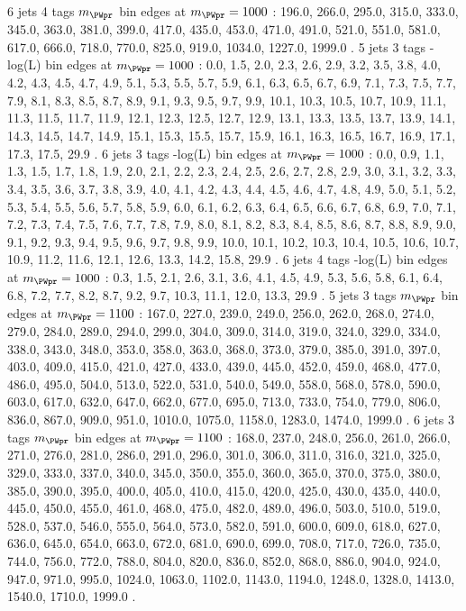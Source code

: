 6 jets 4 \Pqb tags $m_{\PWpr}$ bin edges at $m_{\PWpr}=1000$ \GeV:
196.0, 266.0, 295.0, 315.0, 333.0, 345.0, 363.0, 381.0, 399.0, 417.0, 435.0, 453.0, 471.0, 491.0, 521.0, 551.0, 581.0, 617.0, 666.0, 718.0, 770.0, 825.0, 919.0, 1034.0, 1227.0, 1999.0 .
5 jets 3 \Pqb tags -log(L) bin edges at $m_{\PWpr}=1000$ \GeV:
0.0, 1.5, 2.0, 2.3, 2.6, 2.9, 3.2, 3.5, 3.8, 4.0, 4.2, 4.3, 4.5, 4.7, 4.9, 5.1, 5.3, 5.5, 5.7, 5.9, 6.1, 6.3, 6.5, 6.7, 6.9, 7.1, 7.3, 7.5, 7.7, 7.9, 8.1, 8.3, 8.5, 8.7, 8.9, 9.1, 9.3, 9.5, 9.7, 9.9, 10.1, 10.3, 10.5, 10.7, 10.9, 11.1, 11.3, 11.5, 11.7, 11.9, 12.1, 12.3, 12.5, 12.7, 12.9, 13.1, 13.3, 13.5, 13.7, 13.9, 14.1, 14.3, 14.5, 14.7, 14.9, 15.1, 15.3, 15.5, 15.7, 15.9, 16.1, 16.3, 16.5, 16.7, 16.9, 17.1, 17.3, 17.5, 29.9 .
6 jets 3 \Pqb tags -log(L) bin edges at $m_{\PWpr}=1000$ \GeV:
0.0, 0.9, 1.1, 1.3, 1.5, 1.7, 1.8, 1.9, 2.0, 2.1, 2.2, 2.3, 2.4, 2.5, 2.6, 2.7, 2.8, 2.9, 3.0, 3.1, 3.2, 3.3, 3.4, 3.5, 3.6, 3.7, 3.8, 3.9, 4.0, 4.1, 4.2, 4.3, 4.4, 4.5, 4.6, 4.7, 4.8, 4.9, 5.0, 5.1, 5.2, 5.3, 5.4, 5.5, 5.6, 5.7, 5.8, 5.9, 6.0, 6.1, 6.2, 6.3, 6.4, 6.5, 6.6, 6.7, 6.8, 6.9, 7.0, 7.1, 7.2, 7.3, 7.4, 7.5, 7.6, 7.7, 7.8, 7.9, 8.0, 8.1, 8.2, 8.3, 8.4, 8.5, 8.6, 8.7, 8.8, 8.9, 9.0, 9.1, 9.2, 9.3, 9.4, 9.5, 9.6, 9.7, 9.8, 9.9, 10.0, 10.1, 10.2, 10.3, 10.4, 10.5, 10.6, 10.7, 10.9, 11.2, 11.6, 12.1, 12.6, 13.3, 14.2, 15.8, 29.9 .
6 jets 4 \Pqb tags -log(L) bin edges at $m_{\PWpr}=1000$ \GeV:
0.3, 1.5, 2.1, 2.6, 3.1, 3.6, 4.1, 4.5, 4.9, 5.3, 5.6, 5.8, 6.1, 6.4, 6.8, 7.2, 7.7, 8.2, 8.7, 9.2, 9.7, 10.3, 11.1, 12.0, 13.3, 29.9 .
5 jets 3 \Pqb tags $m_{\PWpr}$ bin edges at $m_{\PWpr}=1100$ \GeV:
167.0, 227.0, 239.0, 249.0, 256.0, 262.0, 268.0, 274.0, 279.0, 284.0, 289.0, 294.0, 299.0, 304.0, 309.0, 314.0, 319.0, 324.0, 329.0, 334.0, 338.0, 343.0, 348.0, 353.0, 358.0, 363.0, 368.0, 373.0, 379.0, 385.0, 391.0, 397.0, 403.0, 409.0, 415.0, 421.0, 427.0, 433.0, 439.0, 445.0, 452.0, 459.0, 468.0, 477.0, 486.0, 495.0, 504.0, 513.0, 522.0, 531.0, 540.0, 549.0, 558.0, 568.0, 578.0, 590.0, 603.0, 617.0, 632.0, 647.0, 662.0, 677.0, 695.0, 713.0, 733.0, 754.0, 779.0, 806.0, 836.0, 867.0, 909.0, 951.0, 1010.0, 1075.0, 1158.0, 1283.0, 1474.0, 1999.0 .
6 jets 3 \Pqb tags $m_{\PWpr}$ bin edges at $m_{\PWpr}=1100$ \GeV:
168.0, 237.0, 248.0, 256.0, 261.0, 266.0, 271.0, 276.0, 281.0, 286.0, 291.0, 296.0, 301.0, 306.0, 311.0, 316.0, 321.0, 325.0, 329.0, 333.0, 337.0, 340.0, 345.0, 350.0, 355.0, 360.0, 365.0, 370.0, 375.0, 380.0, 385.0, 390.0, 395.0, 400.0, 405.0, 410.0, 415.0, 420.0, 425.0, 430.0, 435.0, 440.0, 445.0, 450.0, 455.0, 461.0, 468.0, 475.0, 482.0, 489.0, 496.0, 503.0, 510.0, 519.0, 528.0, 537.0, 546.0, 555.0, 564.0, 573.0, 582.0, 591.0, 600.0, 609.0, 618.0, 627.0, 636.0, 645.0, 654.0, 663.0, 672.0, 681.0, 690.0, 699.0, 708.0, 717.0, 726.0, 735.0, 744.0, 756.0, 772.0, 788.0, 804.0, 820.0, 836.0, 852.0, 868.0, 886.0, 904.0, 924.0, 947.0, 971.0, 995.0, 1024.0, 1063.0, 1102.0, 1143.0, 1194.0, 1248.0, 1328.0, 1413.0, 1540.0, 1710.0, 1999.0 .
